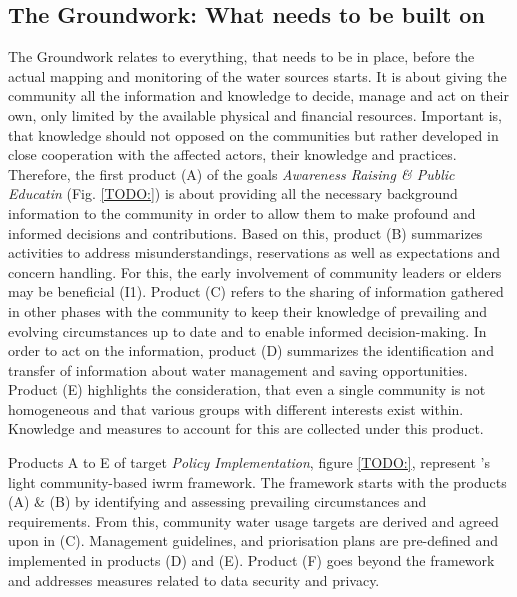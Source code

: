 
\subsection{The Groundwork: What needs to be built on}\label{subsubsec:groundwork}%
The Groundwork relates to everything, that needs to be in place, before the actual mapping and monitoring of the water sources starts. It is about giving the community all the information and knowledge to decide, manage and act on their own, only limited by the available physical and financial resources. Important is, that knowledge should not opposed on the communities but rather developed in close cooperation with the affected actors, their knowledge and practices. Therefore, the first product (A) of the goals \textit{Awareness Raising \& Public Educatin} (Fig. \ref*{TODO:}) is about providing all the necessary background information to the community in order to allow them to make profound and informed decisions and contributions. Based on this, product (B) summarizes activities to address misunderstandings, reservations as well as expectations and concern handling. For this, the early involvement of community leaders or elders may be beneficial (I1). Product (C) refers to the sharing of information gathered in other phases with the community to keep their knowledge of prevailing and evolving circumstances up to date and to enable informed decision-making. In order to act on the information, product (D) summarizes the identification and transfer of information about water management and saving opportunities. Product (E) highlights the consideration, that even a single community is not homogeneous and that various groups with different interests exist within. Knowledge and measures to account for this are collected under this product.\newline


Products A to E of target \textit{Policy Implementation}, figure \ref*{TODO:}, represent \autocite{dayCommunitybasedWaterResources2009}'s light community-based \acrshort{iwrm} framework. The framework starts with the products (A) \& (B) by identifying and assessing prevailing circumstances and requirements. From this, community water usage targets are derived and agreed upon in (C). Management guidelines, and priorisation plans are pre-defined and implemented in products (D) and (E). Product (F) goes beyond the framework and addresses measures related to data security and privacy.

